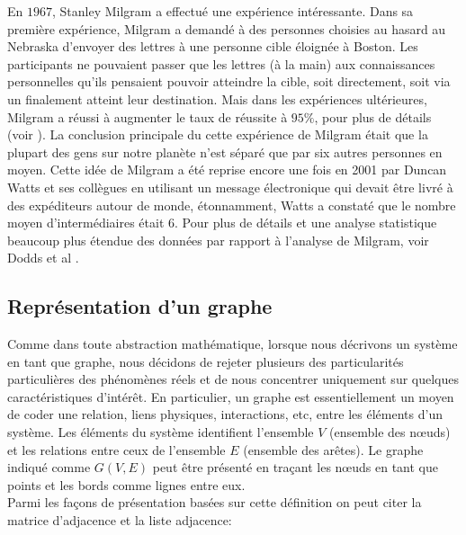 En $1967$, Stanley Milgram a effectué une expérience intéressante.  Dans sa première expérience, Milgram a demandé à des personnes choisies au hasard au Nebraska d'envoyer des lettres à une personne cible éloignée à Boston.
Les participants ne pouvaient passer que les lettres (à la main) aux connaissances personnelles qu'ils pensaient pouvoir 
atteindre la cible, soit directement, soit via un %
finalement atteint leur destination. Mais dans les expériences ultérieures, Milgram a réussi à augmenter
le taux de réussite à $95\%$, pour plus de détails (voir \cite{Mi1967,TM1969}). La conclusion principale du cette expérience
de Milgram était que la plupart des gens sur notre planète n'est séparé que par six autres personnes en moyen. Cette idée de
Milgram a été reprise encore une fois en 2001 par Duncan Watts et ses collègues en utilisant un message électronique qui devait être livré à des expéditeurs autour de monde, étonnamment, Watts a constaté que le nombre moyen d'intermédiaires était
$6$. Pour plus de détails et une analyse statistique beaucoup plus étendue des données par rapport à l'analyse de Milgram,
voir Dodds et al \cite{D-al2003}.

  \subsection{Représentation d'un graphe}
  Comme dans toute abstraction mathématique, lorsque nous décrivons un système en tant que graphe, nous décidons de rejeter  plusieurs des particularités particulières des phénomènes réels et de nous concentrer uniquement sur quelques caractéristiques  d'intérêt. En particulier, un graphe est essentiellement un moyen de coder une relation, liens physiques, interactions,
  etc, entre les éléments d'un système. Les éléments du système identifient l'ensemble $V$ (ensemble des nœuds) et les relations entre ceux de l'ensemble $E$ (ensemble des arêtes). Le graphe indiqué comme $G(V, E)$ peut être présenté en traçant les  nœuds en tant que points et les bords comme lignes entre eux.\\ 
 
   Parmi les façons de présentation basées sur cette définition on peut citer la matrice d'adjacence et la liste adjacence:
